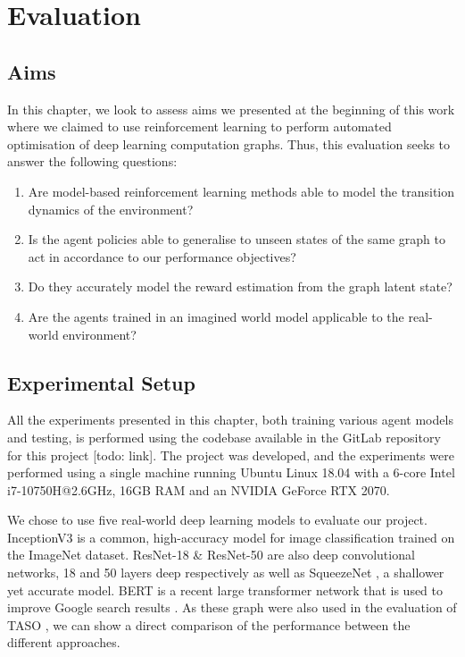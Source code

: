 \chapter{Evaluation}

\section{Aims}

In this chapter, we look to assess aims we presented at the beginning of this work where we claimed to use reinforcement learning to perform automated optimisation of deep learning computation graphs. Thus, this evaluation seeks to answer the following questions:

\begin{enumerate}
  \item Are model-based reinforcement learning methods able to model the transition dynamics of the environment?
  \item Is the agent policies able to generalise to unseen states of the same graph to act in accordance to our performance objectives?
  \item Do they accurately model the reward estimation from the graph latent state?
  \item Are the agents trained in an imagined world model applicable to the real-world environment?
\end{enumerate}

\section{Experimental Setup}

All the experiments presented in this chapter, both training various agent models and testing, is performed using the codebase available in the GitLab repository for this project [todo: link]. The project was developed, and the experiments were performed using a single machine running Ubuntu Linux 18.04 with a 6-core Intel i7-10750H@2.6GHz, 16GB RAM and an NVIDIA GeForce RTX 2070.

We chose to use five real-world deep learning models to evaluate our project. InceptionV3 \cite{szegedy2015rethinking} is a common, high-accuracy model for image classification trained on the ImageNet dataset. ResNet-18 \& ResNet-50 \cite{he2015deep} are also deep convolutional networks, 18 and 50 layers deep respectively as well as SqueezeNet \cite{iandola2016squeezenet}, a shallower yet accurate model. BERT \cite{devlin2019bert} is a recent large transformer network that is used to improve Google search results \cite{nayak2019}. As these graph were also used in the evaluation of TASO \cite{jia2019taso}, we can show a direct comparison of the performance between the different approaches.

